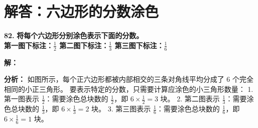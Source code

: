 \newpage



\newpage

\section{解答：六边形的分数涂色}

\vspace{0.6cm}

\textbf{\LARGE 82.} \textbf{将每个六边形分别涂色表示下面的分数。\\[1ex]
第一图下标注：$\displaystyle\frac{1}{2}$ \qquad 第二图下标注：$\displaystyle\frac{1}{3}$ \qquad 第三图下标注：$\displaystyle\frac{1}{6}$}

\vspace{0.4cm}
\textbf{解：}

\textbf{分析：}
如图所示，每个正六边形都被内部相交的三条对角线平均分成了 $6$ 个完全相同的小正三角形。
要表示特定的分数，只需要计算应涂色的小三角形数量：
1. 第一图表示 $\displaystyle\frac{1}{2}$：需要涂色总块数的 $\displaystyle\frac{1}{2}$，即 $6 \times \frac{1}{2} = 3$ 块。
2. 第二图表示 $\displaystyle\frac{1}{3}$：需要涂色总块数的 $\displaystyle\frac{1}{3}$，即 $6 \times \frac{1}{3} = 2$ 块。
3. 第三图表示 $\displaystyle\frac{1}{6}$：需要涂色总块数的 $\displaystyle\frac{1}{6}$，即 $6 \times \frac{1}{6} = 1$ 块。

